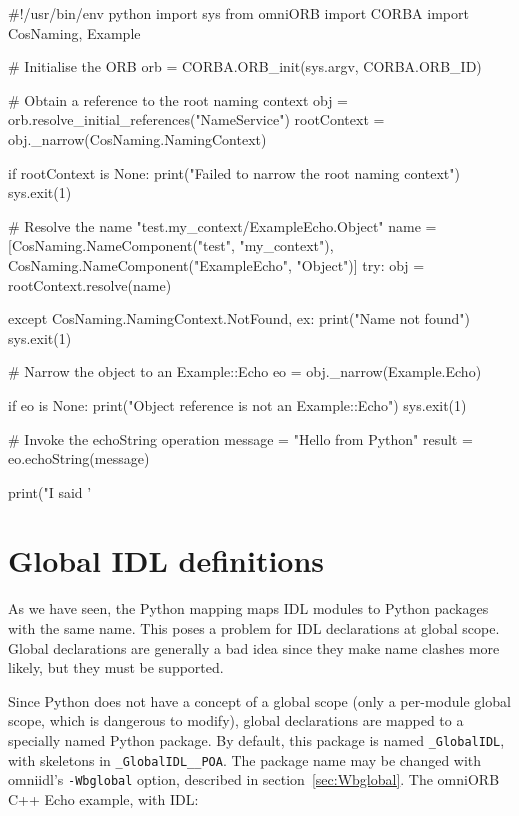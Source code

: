 \documentclass[11pt,oneside,a4paper]{book}
\newcommand{\module}[1]{\texttt{#1}}
\newcommand{\cmdline}[1]{\texttt{#1}}
\begin{document}
\begin{pylisting}
#!/usr/bin/env python
import sys
from omniORB import CORBA
import CosNaming, Example

# Initialise the ORB
orb = CORBA.ORB_init(sys.argv, CORBA.ORB_ID)

# Obtain a reference to the root naming context
obj         = orb.resolve_initial_references("NameService")
rootContext = obj._narrow(CosNaming.NamingContext)

if rootContext is None:
    print("Failed to narrow the root naming context")
    sys.exit(1)

# Resolve the name "test.my_context/ExampleEcho.Object"
name = [CosNaming.NameComponent("test", "my_context"),
        CosNaming.NameComponent("ExampleEcho", "Object")]
try:
    obj = rootContext.resolve(name)

except CosNaming.NamingContext.NotFound, ex:
    print("Name not found")
    sys.exit(1)

# Narrow the object to an Example::Echo
eo = obj._narrow(Example.Echo)

if eo is None:
    print("Object reference is not an Example::Echo")
    sys.exit(1)

# Invoke the echoString operation
message = "Hello from Python"
result  = eo.echoString(message)

print("I said '%
\end{pylisting}




\section{Global IDL definitions}
\label{sec:globalIDL}

As we have seen, the Python mapping maps IDL modules to Python
packages with the same name. This poses a problem for IDL declarations
at global scope. Global declarations are generally a bad idea since
they make name clashes more likely, but they must be supported.

Since Python does not have a concept of a global scope (only a
per-module global scope, which is dangerous to modify), global
declarations are mapped to a specially named Python package. By
default, this package is named \module{\_GlobalIDL}, with skeletons in
\module{\_GlobalIDL\_\_POA}. The package name may be changed with
omniidl's \cmdline{-Wbglobal} option, described in
section~\ref{sec:Wbglobal}. The omniORB C++ Echo example, with IDL:
\end{document}
